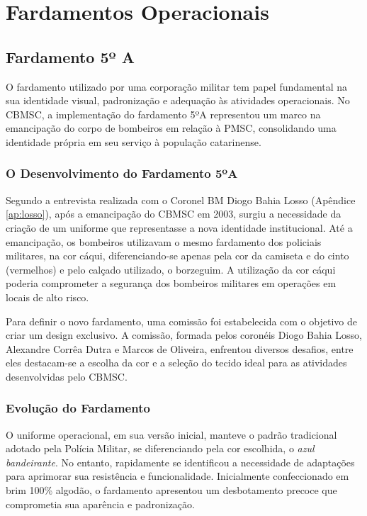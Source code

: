 \chapter{Fardamentos Operacionais}

\section{Fardamento 5º A}

O fardamento utilizado por uma corporação militar tem papel fundamental na sua identidade visual, 
padronização e adequação às atividades operacionais. No \acrfull{CBMSC}, a implementação do 
fardamento 5ºA representou um marco na emancipação do corpo de bombeiros em relação à \acrfull{PMSC}, 
consolidando uma identidade própria em seu serviço à população catarinense.

\subsection{O Desenvolvimento do Fardamento 5ºA}

Segundo a entrevista realizada com o Coronel BM Diogo Bahia Losso (Apêndice \ref{ap:losso}), após 
a emancipação do \acrshort{CBMSC} em 2003, surgiu a necessidade da criação de um uniforme que 
representasse a nova identidade institucional. Até a emancipação, os bombeiros utilizavam o mesmo fardamento
dos policiais militares, na cor cáqui, diferenciando-se apenas pela cor da camiseta e do cinto (vermelhos) 
e pelo calçado utilizado, o borzeguim. A utilização da cor cáqui poderia comprometer a segurança dos
bombeiros militares em operações em locais de alto risco.

Para definir o novo fardamento, uma comissão foi estabelecida com o objetivo de criar um design 
exclusivo. A comissão, formada pelos coronéis Diogo Bahia Losso, Alexandre Corrêa Dutra e Marcos
 de Oliveira, enfrentou diversos desafios, entre eles destacam-se a escolha da cor e a seleção 
 do tecido ideal para as atividades desenvolvidas pelo \acrshort{CBMSC}.


\subsection{Evolução do Fardamento}

O uniforme operacional, em sua versão inicial, manteve o padrão tradicional adotado pela Polícia 
Militar, se diferenciando pela cor escolhida, o \textit{azul bandeirante}. No entanto, rapidamente 
se identificou a necessidade de adaptações para aprimorar sua resistência e funcionalidade. 
Inicialmente confeccionado em brim 100\% algodão, o fardamento apresentou um desbotamento precoce
 que comprometia sua aparência e padronização.

